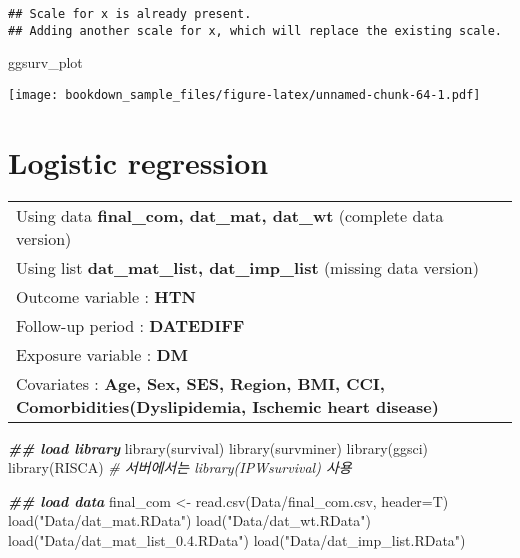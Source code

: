 \documentclass[
]{book}
\newenvironment{Shaded}{\begin{snugshade}}{\end{snugshade}}
\newcommand{\AttributeTok}[1]{\textcolor[rgb]{0.77,0.63,0.00}{#1}}
\newcommand{\CommentTok}[1]{\textcolor[rgb]{0.56,0.35,0.01}{\textit{#1}}}
\newcommand{\DocumentationTok}[1]{\textcolor[rgb]{0.56,0.35,0.01}{\textbf{\textit{#1}}}}
\newcommand{\FunctionTok}[1]{\textcolor[rgb]{0.00,0.00,0.00}{#1}}
\newcommand{\NormalTok}[1]{#1}
\newcommand{\OtherTok}[1]{\textcolor[rgb]{0.56,0.35,0.01}{#1}}
\newcommand{\StringTok}[1]{\textcolor[rgb]{0.31,0.60,0.02}{#1}}
\begin{document}
\begin{verbatim}
## Scale for x is already present.
## Adding another scale for x, which will replace the existing scale.
\end{verbatim}

\begin{Shaded}
\begin{Highlighting}[]
\NormalTok{ggsurv\_plot}
\end{Highlighting}
\end{Shaded}

\texttt{[image: bookdown\_sample\_files/figure-latex/unnamed-chunk-64-1.pdf]}

\hypertarget{logistic-regression}{%
\chapter{Logistic regression}\label{logistic-regression}}

\begin{longtable}[]{@{}l@{}}
\toprule()
\endhead
Using data \textbf{final\_com, dat\_mat, dat\_wt} (complete data version) \\
Using list \textbf{dat\_mat\_list, dat\_imp\_list} (missing data version) \\
Outcome variable : \textbf{HTN} \\
Follow-up period : \textbf{DATEDIFF} \\
Exposure variable : \textbf{DM} \\
Covariates : \textbf{Age, Sex, SES, Region, BMI, CCI, Comorbidities(Dyslipidemia, Ischemic heart disease)} \\
\bottomrule()
\end{longtable}

\begin{Shaded}
\begin{Highlighting}[]
\DocumentationTok{\#\# load library}
\FunctionTok{library}\NormalTok{(survival)}
\FunctionTok{library}\NormalTok{(survminer)}
\FunctionTok{library}\NormalTok{(ggsci)}
\FunctionTok{library}\NormalTok{(RISCA) }\CommentTok{\# 서버에서는 library(IPWsurvival) 사용}
\end{Highlighting}
\end{Shaded}

\begin{Shaded}
\begin{Highlighting}[]
\DocumentationTok{\#\# load data}
\NormalTok{final\_com }\OtherTok{\textless{}{-}} \FunctionTok{read.csv}\NormalTok{(}\StringTok{\textquotesingle{}Data/final\_com.csv\textquotesingle{}}\NormalTok{, }\AttributeTok{header=}\NormalTok{T)}
\FunctionTok{load}\NormalTok{(}\StringTok{"Data/dat\_mat.RData"}\NormalTok{)}
\FunctionTok{load}\NormalTok{(}\StringTok{"Data/dat\_wt.RData"}\NormalTok{)}
\FunctionTok{load}\NormalTok{(}\StringTok{"Data/dat\_mat\_list\_0.4.RData"}\NormalTok{)}
\FunctionTok{load}\NormalTok{(}\StringTok{"Data/dat\_imp\_list.RData"}\NormalTok{)}
\end{Highlighting}
\end{Shaded}
\end{document}
